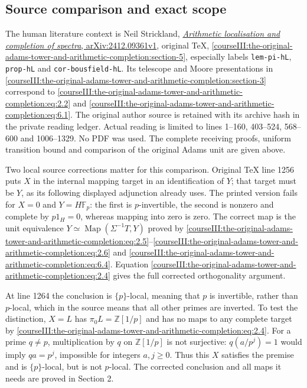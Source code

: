 \subsection{Source comparison and exact scope}
\label{courseIII:the-original-adams-tower-and-arithmetic-completion:arithmetic-source-comparison}

\label{courseIII:the-original-adams-tower-and-arithmetic-completion:section-9}\label{courseIII:adams-arithmetic:9}

The human literature context is Neil Strickland, \href{https://arxiv.org/abs/2412.09361v1}{\emph{Arithmetic localisation and completion of spectra}, arXiv:2412.09361v1}, original TeX, \cref{courseIII:the-original-adams-tower-and-arithmetic-completion:section-5}, especially labels \texttt{lem-pi-hL}, \texttt{prop-hL} and \texttt{cor-bousfield-hL}. Its telescope and Moore presentations in \cref{courseIII:the-original-adams-tower-and-arithmetic-completion:section-3} correspond to \eqref{courseIII:the-original-adams-tower-and-arithmetic-completion:eq:2.2} and \eqref{courseIII:the-original-adams-tower-and-arithmetic-completion:eq:6.1}. The original author source is retained with its archive hash in the private reading ledger. Actual reading is limited to lines 1--160, 403--524, 568--600 and 1006--1329. No PDF was used. The complete receiving proofs, uniform transition bound and comparison of the original Adams unit are given above.

Two local source corrections matter for this comparison. Original TeX line 1256 puts \(X\) in the internal mapping target in an identification of \(Y\); that target must be \(Y\), as its following displayed adjunction already uses. The printed version fails for \(X=0\) and \(Y=H\mathbb F_p\): the first is \(p\)-invertible, the second is nonzero and complete by \(p1_H=0\), whereas mapping into zero is zero. The correct map is the unit equivalence \(Y\simeq\operatorname{Map}(\Sigma^{-1}T,Y)\) proved by \eqref{courseIII:the-original-adams-tower-and-arithmetic-completion:eq:2.5}--\eqref{courseIII:the-original-adams-tower-and-arithmetic-completion:eq:2.6} and \eqref{courseIII:the-original-adams-tower-and-arithmetic-completion:eq:6.4}. Equation \eqref{courseIII:the-original-adams-tower-and-arithmetic-completion:eq:2.4} gives the full corrected orthogonality argument.

At line 1264 the conclusion is \(\{p\}\)-local, meaning that \(p\) is invertible, rather than \(p\)-local, which in the source means that all other primes are inverted. To test the distinction, \(X=L\) has \(\pi_0L=\mathbb Z[1/p]\) and has no maps to any complete target by \eqref{courseIII:the-original-adams-tower-and-arithmetic-completion:eq:2.4}. For a prime \(q\ne p\), multiplication by \(q\) on \(\mathbb Z[1/p]\) is not surjective: \(q(a/p^j)=1\) would imply \(qa=p^j\), impossible for integers \(a,j\geq0\). Thus this \(X\) satisfies the premise and is \(\{p\}\)-local, but is not \(p\)-local. The corrected conclusion and all maps it needs are proved in Section 2.

